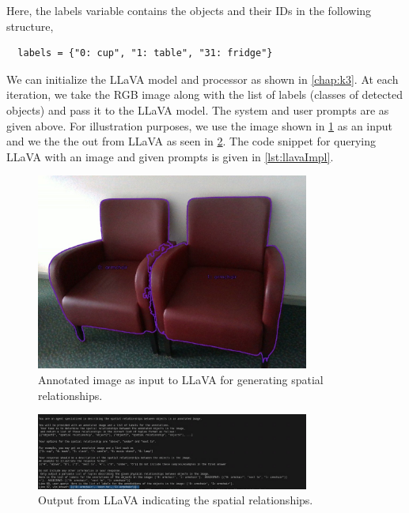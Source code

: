 Here, the labels variable contains the objects and their IDs in the following structure, 
\begin{lstlisting}
  labels = {"0: cup", "1: table", "31: fridge"}
\end{lstlisting}
We can initialize the LLaVA model and processor as shown in \cref{chap:k3}. At each iteration, we take the RGB image along with 
the list of labels (classes of detected objects) and pass it to the LLaVA model. The system and user prompts are as given above.
For illustration purposes, we use the image shown in \cref{fig:llava1} as an input and we the the out from LLaVA as seen in \cref{fig:llava2}. The code
snippet for querying LLaVA with an image and given prompts is given in \cref{lst:llavaImpl}.

\begin{figure}[ht!]
  \centering
  \includegraphics[width=0.8\textwidth]{content/images/impl/LLaVA_input.jpg}
  \caption{Annotated image as input to LLaVA for generating spatial relationships.}
  \label{fig:llava1}
\end{figure}

\begin{figure}[ht!]
  \centering
  \includegraphics[width=0.8\textwidth]{content/images/impl/LLaVA_output.png}
  \caption{Output from LLaVA indicating the spatial relationships.}
  \label{fig:llava2}
\end{figure}
